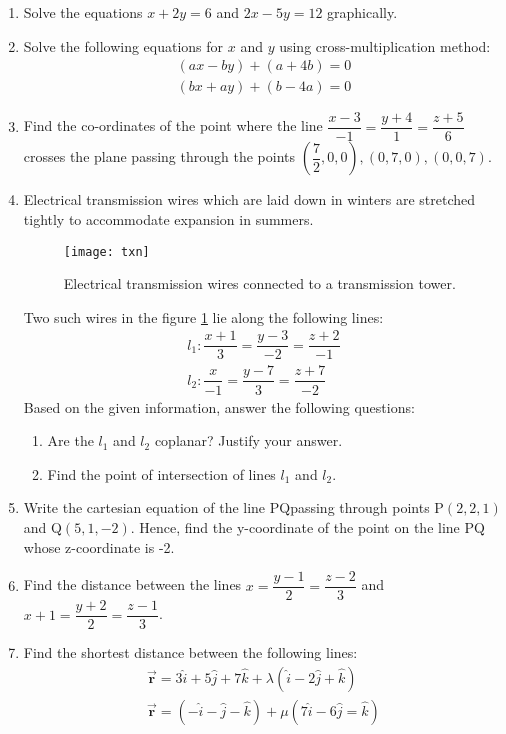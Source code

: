 %
\begin{enumerate}
\item Solve the equations $x+2y=6$ and $2x-5y=12$ graphically.	
\item Solve the following equations for $x$ and $y$ using cross-multiplication method:
	\begin{align}
		(ax-by)+(a+4b)=0\\(bx+ay)+(b-4a)=0
	\end{align}
\item Find the co-ordinates of the point where the line $\dfrac{x-3}{-1}=\dfrac{y+4}{1}=\dfrac{z+5}{6}$ crosses the plane passing through the points $\left(\dfrac{7}{2},0,0\right),(0,7,0),(0,0,7)$.
\item Electrical transmission wires which are laid down in winters are stretched tightly to accommodate expansion in summers.
	\begin{figure}[H]
		\centering
		\texttt{[image: txn]}
		\caption{Electrical transmission wires connected to a transmission tower.}
		\label{fig:txn1}
	\end{figure}
		Two such wires in the figure \ref{fig:txn1} lie along the following lines:
		\begin{align}
			&l_1 : \dfrac{x+1}{3}=\dfrac{y-3}{-2}=\dfrac{z+2}{-1}&\\
			 &l_2 : \dfrac{x}{-1}=\dfrac{y-7}{3}=\dfrac{z+7}{-2}&
		\end{align}
	Based on the given information, answer the following questions:	\begin{enumerate}
		\item	Are the $l_1$ and $l_2$ coplanar? Justify your answer.
				\item    Find the point of intersection of lines $l_1$ and $l_2$.
			\end{enumerate}
     \item Write the cartesian equation of the line PQ\@ passing through points P$(2,2,1)$ and Q$(5,1,-2)$. Hence, find the y-coordinate of the point on the line PQ whose z-coordinate is -2.
			\item Find the distance between the lines $x=\dfrac{y-1}{2}=\dfrac{z-2}{3}$ and $x+1=\dfrac{y+2}{2}=\dfrac{z-1}{3}$.
\item Find the shortest distance between the following lines:
	\begin{align}
		&\overrightarrow{\textbf{r}}=3\hat{i}+5\hat{j}+7\hat{k}+\lambda(\hat{i}-2\hat{j}+\hat{k})&\\&\overrightarrow{\textbf{r}}=(-\hat{i}-\hat{j}-\hat{k})+\mu(7\hat{i}-6\hat{j}=\hat{k})&

\end{align}
\end{enumerate}
